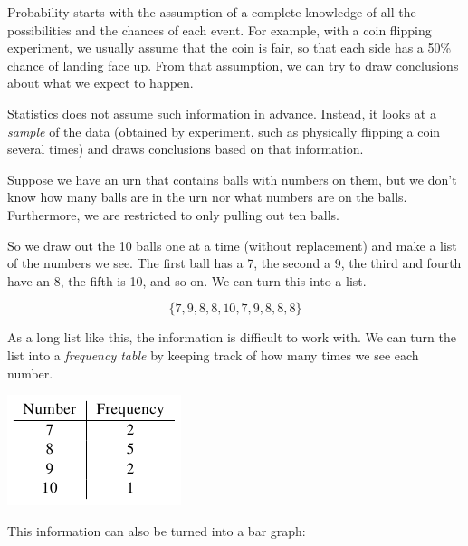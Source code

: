 \documentclass{ximera}
\begin{document}
Probability starts with the assumption of a complete knowledge of all the possibilities and the chances of each event. For example, with a coin flipping experiment, we usually assume that the coin is fair, so that each side has a 50\% chance of landing face up. From that assumption, we can try to draw conclusions about what we expect to happen.

Statistics does not assume such information in advance. Instead, it looks at a \emph{sample} of the data (obtained by experiment, such as physically flipping a coin several times) and draws conclusions based on that information.

Suppose we have an urn that contains balls with numbers on them, but we don't know how many balls are in the urn nor what numbers are on the balls. Furthermore, we are restricted to only pulling out ten balls.

So we draw out the 10 balls one at a time (without replacement) and make a list of the numbers we see. The first ball has a 7, the second a 9, the third and fourth have an 8, the fifth is 10, and so on. We can turn this into a list.

\[ \{ 7, 9, 8, 8, 10, 7, 9, 8, 8, 8 \} \]

As a long list like this, the information is difficult to work with. We can turn the list into a \emph{frequency table} by keeping track of how many times we see each number.

\begin{image}
\includegraphics{StatsTable1.png}
\end{image}

This information can also be turned into a bar graph:
\end{document}
